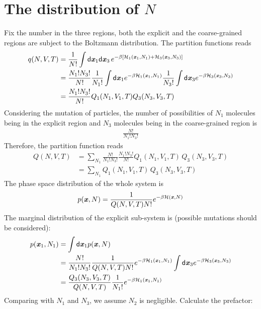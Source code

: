 \documentclass[aps,pre,preprint]{revtex4}
\renewcommand{\v}[1]{\textbf{\textit{#1}}}
\renewcommand{\d}[1]{\textsf{#1}}
\begin{document}
\section{The distribution of $N$}
Fix the number in the three regions, both the explicit and the
coarse-grained regions are subject to the Boltzmann distribution. The
partition functions reads
\begin{align}\nonumber
  q(N,V,T)
  &= \frac1{N!}\int
  \d d\v x_1\d d\v x_3\,
  e^{-\beta
    [\mathcal H_1(\v x_1, N_1) + \mathcal H_3(\v x_3, N_3)]}\\\nonumber
  & = \frac{N_1!N_3!}{N!}
  \frac{1}{N_1!}\int\d d\v x_1 e^{-\beta\mathcal H_1(\v x_1, N_1)}
  \frac{1}{N_3!}\int\d d\v x_3 e^{-\beta\mathcal H_3(\v x_3, N_3)}\\
  & = \frac{N_1!N_3!}{N!}
  Q_1(N_1, V_1, T)
  Q_3(N_3, V_3, T) 
\end{align}
Considering the mutation of particles, the number of possibilities of
$N_1$ molecules being in the explicit region and $N_3$ molecules being
in the coarse-grained region is
\begin{align}
  \frac{N!}{N_1!N_3!}
\end{align}
Therefore, the partition function reads
\begin{align}\nonumber
  Q(N,V,T) &= \sum_{N_1}
  \frac{N!}{N_1!N_3!} \frac{N_1!N_3!}{N!}
  Q_1(N_1, V_1, T)\,
  Q_3(N_3, V_3, T) \\
  &= \sum_{N_1}
  Q_1(N_1, V_1, T)\,
  Q_3(N_3, V_3, T) 
\end{align}
The phase space distribution of the whole system is
\begin{align}
  p(\v x, N) = \frac{1}{Q(N,V,T) N!} e^{-\beta\mathcal H(\v x, N)}
\end{align}
The marginal distribution of the explicit sub-system is (possible
mutations should be considered):
\begin{align}\nonumber
  p(\v x_1, N_1)
  &=
  \int \d d\v x_1p(\v x, N)  \\ \nonumber
  &=
  \frac{N!}{N_1!N_3!}\frac{1}{Q(N,V,T) N!}
  e^{-\beta\mathcal H_1(\v x_1, N_1)}
  \int \d d\v x_3
  e^{-\beta\mathcal H_3(\v x_3, N_3)} \\
  & =
  \frac{Q_3(N_3,V_3,T)}{Q(N,V,T)}\frac{1}{N_1!} e^{-\beta\mathcal H_1(\v x_1, N_1)}
\end{align}
Comparing with $N_1$ and $N_3$, we assume $N_2$ is
negligible. Calculate the prefactor:
\end{document}
